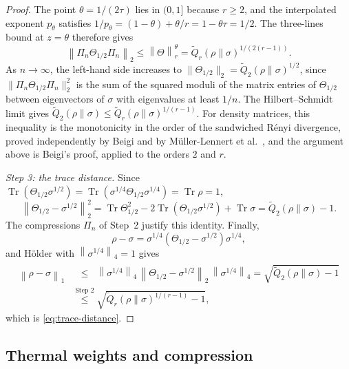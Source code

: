 \documentclass[11pt]{amsart}
\numberwithin{equation}{section}
\theoremstyle{definition}
\newcommand{\Qtil}{\widetilde Q}
\newcommand{\Tr}{\operatorname{Tr}}
\newcommand{\norm}[1]{\left\|#1\right\|}
\begin{document}
\begin{proof}
The point \(\theta=1/(2\tau)\) lies in \((0,1]\) because \(r\ge2\), and
the interpolated exponent \(p_\theta\) satisfies
\(1/p_\theta=(1-\theta)+\theta/r=1-\theta\tau=1/2\). The three-lines
bound at \(z=\theta\) therefore gives
\[
 \norm{\Pi_n\Theta_{1/2}\Pi_n}_2
 \le\norm{\Theta}_r^{\theta}
 =\Qtil_r(\rho\|\sigma)^{1/(2(r-1))}.
\]
As \(n\to\infty\), the left-hand side increases to
\(\lVert\Theta_{1/2}\rVert_2=\Qtil_2(\rho\|\sigma)^{1/2}\), since
\(\lVert\Pi_n\Theta_{1/2}\Pi_n\rVert_2^2\) is the sum of the squared moduli
of the matrix entries of \(\Theta_{1/2}\) between eigenvectors of
\(\sigma\) with eigenvalues at least \(1/n\).
The Hilbert--Schmidt limit gives
\(\Qtil_2(\rho\|\sigma)\le\Qtil_r(\rho\|\sigma)^{1/(r-1)}\). For density
matrices, this inequality is the monotonicity in the order of the
sandwiched Rényi divergence, proved independently by Beigi
\cite[Theorem~7]{Beigi13} and by Müller-Lennert et al.\
\cite[Theorem~7]{ML13}, and the argument above is Beigi's proof, applied
to the orders \(2\) and \(r\).

\smallskip
\emph{Step 3: the trace distance.} Since
\(\Tr(\Theta_{1/2}\sigma^{1/2})
=\Tr(\sigma^{1/4}\Theta_{1/2}\sigma^{1/4})=\Tr\rho=1\),
\[
 \norm{\Theta_{1/2}-\sigma^{1/2}}_2^2
 =\Tr\Theta_{1/2}^2-2\Tr(\Theta_{1/2}\sigma^{1/2})+\Tr\sigma
 =\Qtil_2(\rho\|\sigma)-1.
\]
The compressions \(\Pi_n\) of Step~2 justify this identity. Finally,
\[
 \rho-\sigma
 =\sigma^{1/4}(\Theta_{1/2}-\sigma^{1/2})\sigma^{1/4},
\]
and Hölder with \(\norm{\sigma^{1/4}}_4=1\) gives
\begin{align*}
 \norm{\rho-\sigma}_1
 &\overset{\phantom{\text{Step 2}}}{\le}\norm{\sigma^{1/4}}_4\,\norm{\Theta_{1/2}-\sigma^{1/2}}_2\,
   \norm{\sigma^{1/4}}_4
 =\sqrt{\Qtil_2(\rho\|\sigma)-1}\\
 &\overset{\text{Step 2}}{\le}\sqrt{\Qtil_r(\rho\|\sigma)^{1/(r-1)}-1},
\end{align*}
which is \eqref{eq:trace-distance}.
\end{proof}

\subsection{Thermal weights and compression}
\end{document}

